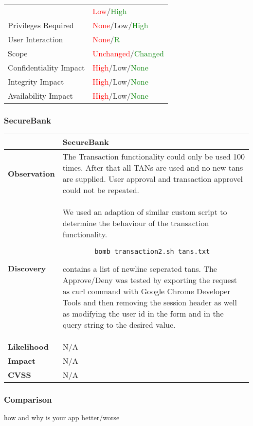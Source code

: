 \begin{tabular*}{\textwidth}{ p{} | p{} }
\begin{tabular}{l | l}
            Attack Complexity       & \textcolor{red}{Low}/\textcolor{Green}{High} \\
            Privileges Required     & \textcolor{red}{None}/\textcolor{BurntOrange}{Low}/\textcolor{Green}{High} \\
            User Interaction        & \textcolor{red}{None}/\textcolor{Green}{R} \\
            Scope                   & \textcolor{red}{Unchanged}/\textcolor{Green}{Changed} \\
            Confidentiality Impact  & \textcolor{red}{High}/\textcolor{BurntOrange}{Low}/\textcolor{Green}{None} \\
            Integrity Impact        & \textcolor{red}{High}/\textcolor{BurntOrange}{Low}/\textcolor{Green}{None} \\
            Availability Impact     & \textcolor{red}{High}/\textcolor{BurntOrange}{Low}/\textcolor{Green}{None}
        \end{tabular}
    \\ \hline
\end{tabular*}

\subsubsection{SecureBank}
\begin{tabular*}{\textwidth}{ p{} | p{} }\hline
    & \textbf{SecureBank} \\ \hline
    \textbf{Observation} & 
    The Transaction functionality could only be used 100 times. After that all TANs are used and no new tans are supplied.
    User approval and transaction approvel could not be repeated.
    \\
    \textbf{Discovery} & 
    	We used an adaption of similar custom script to determine the behaviour of the transaction functionality.
    	\begin{lstlisting}
    	bomb_transaction2.sh tans.txt
    	\end{lstlisting}
    	\code{tans.txt} contains a list of newline seperated tans.\newline
    	The Approve/Deny was tested by exporting the request as curl command with Google Chrome Developer Tools and then removing the session header as well as modifying the user id in the form and in the query string to the desired value.
    \\
    \textbf{Likelihood} &
    	N/A
    \\
    \textbf{Impact} & 
    	N/A
    \\
    \textbf{CVSS} &
    	N/A
    \\ \hline
\end{tabular*}

\subsubsection{Comparison}
how and why is your app better/worse
\clearpage
\clearpage